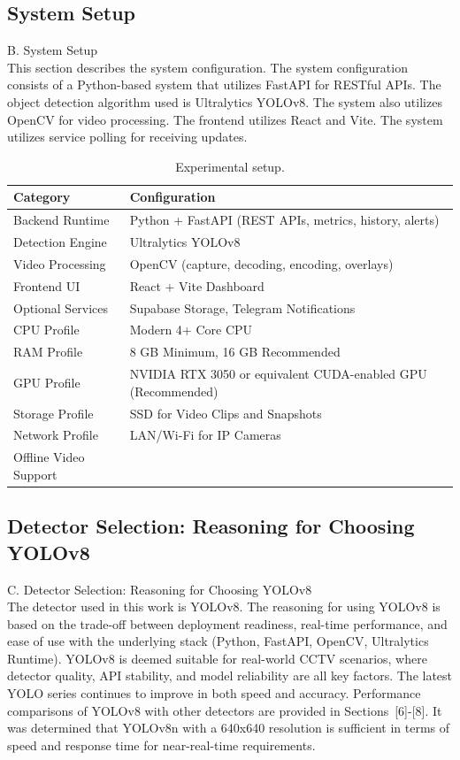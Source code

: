 \documentclass[conference]{IEEEtran}
\begin{document}
\subsection{System Setup}
B. System Setup\\
This section describes the system configuration. The system configuration consists of a Python-based system that utilizes FastAPI for RESTful APIs. The object detection algorithm used is Ultralytics YOLOv8. The system also utilizes OpenCV for video processing. The frontend utilizes React and Vite. The system utilizes service polling for receiving updates.

\begin{table}[!htbp]
\caption{Experimental setup.}
\label{tab:exp-setup}
\centering
\begin{tabular}{ll}
\toprule
\textbf{Category} & \textbf{Configuration}\\
\midrule
Backend Runtime & Python + FastAPI (REST APIs, metrics, history, alerts)\\
Detection Engine & Ultralytics YOLOv8\\
Video Processing & OpenCV (capture, decoding, encoding, overlays)\\
Frontend UI & React + Vite Dashboard\\
Optional Services & Supabase Storage, Telegram Notifications\\
CPU Profile & Modern 4+ Core CPU\\
RAM Profile & 8 GB Minimum, 16 GB Recommended\\
GPU Profile & NVIDIA RTX 3050 or equivalent CUDA-enabled GPU (Recommended)\\
Storage Profile & SSD for Video Clips and Snapshots\\
Network Profile & LAN/Wi-Fi for IP Cameras\\
Offline Video Support\\
\bottomrule
\end{tabular}
\end{table}


\subsection{Detector Selection: Reasoning for Choosing YOLOv8}
C. Detector Selection: Reasoning for Choosing YOLOv8\\
The detector used in this work is YOLOv8. The reasoning for using YOLOv8 is based on the trade-off between deployment readiness, real-time performance, and ease of use with the underlying stack (Python, FastAPI, OpenCV, Ultralytics Runtime). YOLOv8 is deemed suitable for real-world CCTV scenarios, where detector quality, API stability, and model reliability are all key factors. The latest YOLO series continues to improve in both speed and accuracy. Performance comparisons of YOLOv8 with other detectors are provided in Sections~[6]-[8]. It was determined that YOLOv8n with a 640x640 resolution is sufficient in terms of speed and response time for near-real-time requirements.
\end{document}
